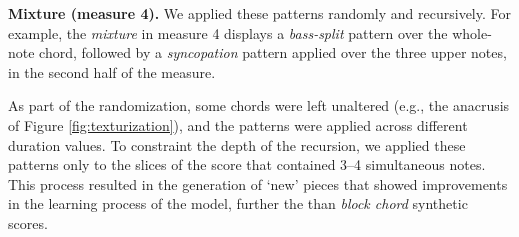\textbf{Mixture (measure 4).} We applied these patterns
randomly and recursively. For example, the \emph{mixture} in
measure 4 displays a \emph{bass-split} pattern over the
whole-note chord, followed by a \emph{syncopation} pattern
applied over the three upper notes, in the second half of
the measure.

As part of the randomization, some chords were left
unaltered (e.g., the anacrusis of Figure
\ref{fig:texturization}), and the patterns were applied
across different duration values. To constraint the depth of
the recursion, we applied these patterns only to the slices
of the score that contained 3--4 simultaneous notes. This
process resulted in the generation of `new' pieces that
showed improvements in the learning process of the model,
further the than \emph{block chord} synthetic scores.
